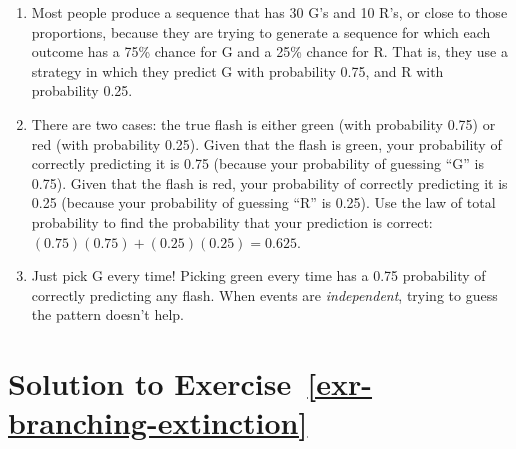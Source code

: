 \documentclass[
  letterpaper,
  DIV=11,
  numbers=noendperiod]{scrreprt}
\providecommand{\tightlist}{%
  \setlength{\itemsep}{0pt}\setlength{\parskip}{0pt}}
\theoremstyle{plain}
\theoremstyle{definition}
\theoremstyle{definition}
\theoremstyle{definition}
\theoremstyle{remark}
\begin{document}
\begin{enumerate}
\def\labelenumi{\arabic{enumi}.}
\tightlist
\item
  Most people produce a sequence that has 30 G's and 10 R's, or close to
  those proportions, because they are trying to generate a sequence for
  which each outcome has a 75\% chance for G and a 25\% chance for R.
  That is, they use a strategy in which they predict G with probability
  0.75, and R with probability 0.25.
\item
  There are two cases: the true flash is either green (with probability
  0.75) or red (with probability 0.25). Given that the flash is green,
  your probability of correctly predicting it is 0.75 (because your
  probability of guessing ``G'' is 0.75). Given that the flash is red,
  your probability of correctly predicting it is 0.25 (because your
  probability of guessing ``R'' is 0.25). Use the law of total
  probability to find the probability that your prediction is correct:
  \((0.75)(0.75) + (0.25)(0.25) = 0.625\).
\item
  Just pick G every time! Picking green every time has a 0.75
  probability of correctly predicting any flash. When events are
  \emph{independent}, trying to guess the pattern doesn't help.
\end{enumerate}

\section{\texorpdfstring{Solution to
Exercise~\ref{exr-branching-extinction}}{Solution to Exercise~}}\label{solution-to-exr-branching-extinction}
\end{document}
